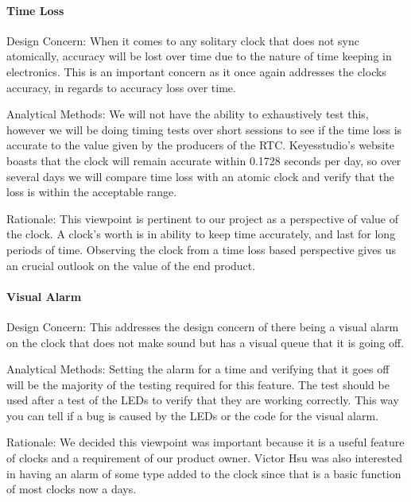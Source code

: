 \documentclass[onecolumn, draftclsnofoot,10pt, compsoc]{IEEEtran}
\begin{document}
\paragraph{Time Loss}
\vspace{2mm} Design Concern: When it comes to any solitary clock that does not sync atomically, accuracy will be lost over time due to the nature of time keeping in electronics.
This is an important concern as it once again addresses the clocks accuracy, in regards to accuracy loss over time.

\vspace{2mm} Analytical Methods: We will not have the ability to exhaustively test this, however we will be doing timing tests over short sessions to see if the time loss is accurate to the value given by the producers of the RTC.
Keyesstudio's website boasts that the clock will remain accurate within 0.1728 seconds per day, so over several days we will compare time loss with an atomic clock  and verify that the loss is within the acceptable range.

\vspace{2mm} Rationale: This viewpoint is pertinent to our project as a perspective of value of the clock.
A clock's worth is in ability to keep time accurately, and last for long periods of time.
Observing the clock from a time loss based perspective gives us an crucial outlook on the value of the end product.

\paragraph{Visual Alarm}
\vspace{2mm} Design Concern: This addresses the design concern of there being a visual alarm on the clock that does not make sound but has a visual queue that it is going off.

\vspace{2mm} Analytical Methods: Setting the alarm for a time and verifying that it goes off will be the majority of the testing required for this feature.
The test should be used after a test of the LEDs to verify that they are working correctly.
This way you can tell if a bug is caused by the LEDs or the code for the visual alarm.

\vspace{2mm} Rationale: We decided this viewpoint was important because it is a useful feature of clocks and a requirement of our product owner.
Victor Hsu was also interested in having an alarm of some type added to the clock since that is a basic function of most clocks now a days.
\end{document}
